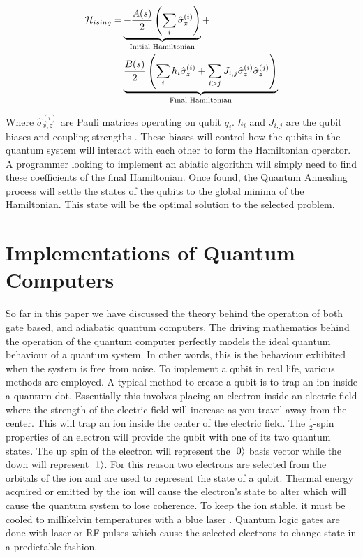 \documentclass[conference]{IEEEtran}
\begin{document}
\begin{align*}
{\cal H}_{ising} = & \underbrace{- \frac{A({s})}{2} \left(\sum_i {\hat\sigma_{x}^{(i)}}\right)}_\text{Initial Hamiltonian} + \\
& \underbrace{\frac{B({s})}{2} \left(\sum_{i} h_i {\hat\sigma_{z}^{(i)}} + \sum_{i>j} J_{i,j} {\hat\sigma_{z}^{(i)}} {\hat\sigma_{z}^{(j)}}\right)}_\text{Final Hamiltonian}
\end{align*}

Where ${\hat\sigma_{x,z}^{(i)}}$ are Pauli matrices operating on qubit $q_i$. $h_i$ and $J_{i,j}$ are the qubit biases and coupling strengths \cite{b13}. These biases will control how the qubits in the quantum system will interact with each other to form the Hamiltonian operator. A programmer looking to implement an abiatic algorithm will simply need to find these coefficients of the final Hamiltonian. Once found, the Quantum Annealing process will settle the states of the qubits to the global minima of the Hamiltonian. This state will be the optimal solution to the selected problem.

\section{Implementations of Quantum Computers}

So far in this paper we have discussed the theory behind the operation of both gate based, and adiabatic quantum computers. The driving mathematics behind the operation of the quantum computer perfectly models the ideal quantum behaviour of a quantum system. In other words, this is the behaviour exhibited when the system is free from noise. To implement a qubit in real life, various methods are employed. A typical method to create a qubit is to trap an ion inside a quantum dot. Essentially this involves placing an electron inside an electric field where the strength of the electric field will increase as you travel away from the center. This will trap an ion inside the center of the electric field. The $\frac{1}{2}$-spin properties of an electron will provide the qubit with one of its two quantum states. The up spin of the electron will represent the $\ket{0}$ basis vector while the down will represent $\ket{1}$. For this reason two electrons are selected from the orbitals of the ion and are used to represent the state of a qubit. Thermal energy acquired or emitted by the ion will cause the electron's state to alter which will cause the quantum system to lose coherence. To keep the ion stable, it must be cooled to millikelvin temperatures with a blue laser \cite{b1}. Quantum logic gates are done with laser or RF pulses which cause the selected electrons to change state in a predictable fashion. 
\end{document}
